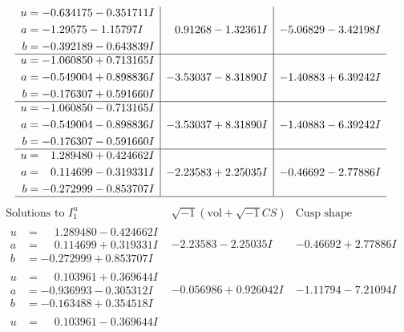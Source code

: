 \documentclass[1p]{elsarticle_modified}
\theoremstyle{definition}
\newcommand{\I}{\sqrt{-1}}
\begin{document}
$$\begin{array}{c|c|c}
\begin{aligned}
u &= -0.634175 - 0.351711 I \\
a &= -1.29575 - 1.15797 I \\
b &= -0.392189 - 0.643839 I\end{aligned}
 & \phantom{-}0.91268 - 1.32361 I & -5.06829 - 3.42198 I \\ \hline\begin{aligned}
u &= -1.060850 + 0.713165 I \\
a &= -0.549004 + 0.898836 I \\
b &= -0.176307 + 0.591660 I\end{aligned}
 & -3.53037 - 8.31890 I & -1.40883 + 6.39242 I \\ \hline\begin{aligned}
u &= -1.060850 - 0.713165 I \\
a &= -0.549004 - 0.898836 I \\
b &= -0.176307 - 0.591660 I\end{aligned}
 & -3.53037 + 8.31890 I & -1.40883 - 6.39242 I \\ \hline\begin{aligned}
u &= \phantom{-}1.289480 + 0.424662 I \\
a &= \phantom{-}0.114699 - 0.319331 I \\
b &= -0.272999 - 0.853707 I\end{aligned}
 & -2.23583 + 2.25035 I & -0.46692 - 2.77886 I\\
 \hline 
 \end{array}$$\newpage$$\begin{array}{c|c|c}  
\text{Solutions to }I^u_{1}& \I (\text{vol} + \sqrt{-1}CS) & \text{Cusp shape}\\
 \hline 
\begin{aligned}
u &= \phantom{-}1.289480 - 0.424662 I \\
a &= \phantom{-}0.114699 + 0.319331 I \\
b &= -0.272999 + 0.853707 I\end{aligned}
 & -2.23583 - 2.25035 I & -0.46692 + 2.77886 I \\ \hline\begin{aligned}
u &= \phantom{-}0.103961 + 0.369644 I \\
a &= -0.936993 - 0.305312 I \\
b &= -0.163488 + 0.354518 I\end{aligned}
 & -0.056986 + 0.926042 I & -1.11794 - 7.21094 I \\ \hline\begin{aligned}
u &= \phantom{-}0.103961 - 0.369644 I \\

\end{aligned}
\end{array}$$
\end{document}
